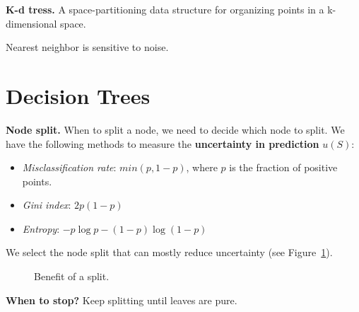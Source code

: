 \textbf{K-d tress.}\hspace{0.2cm} A space-partitioning data structure for organizing points in a k-dimensional space.

\begin{remark}
	Nearest neighbor is sensitive to noise.
\end{remark}

\section{Decision Trees}
\textbf{Node split.}\hspace{0.2cm} When to split a node, we need to decide which 
node to split. We have the following methods to measure the \textbf{uncertainty in prediction} $u(S)$:
\begin{itemize}
	\item \textit{Misclassification rate}: $min(p, 1-p)$, where $p$ is the fraction of positive points.
	\item \textit{Gini index}: $2p(1-p)$
	\item \textit{Entropy}: $-p\log p - (1-p)\log(1-p)$
\end{itemize}
We select the node split that can mostly reduce uncertainty (see Figure~\ref{fig:feb-dt-split}).
\begin{figure}[h]
	\label{fig:feb-dt-split}
	\caption{Benefit of a split.}
\end{figure} 


\textbf{When to stop?}\hspace{0.2cm} Keep splitting until leaves are pure. 

